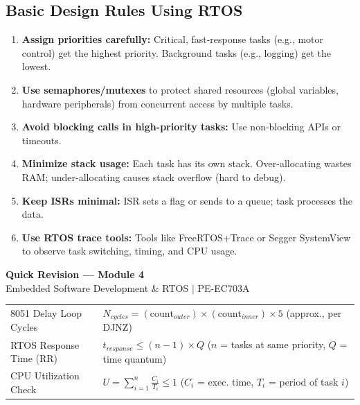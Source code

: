 \documentclass[12pt,a4paper]{article}
\renewcommand{\arraystretch}{1.45}
\begin{document}
\subsection{Basic Design Rules Using RTOS}
\begin{enumerate}[label=\textbf{\arabic*.}, leftmargin=*, itemsep=4pt]
  \item \textbf{Assign priorities carefully:} Critical, fast-response tasks (e.g., motor control) get the highest priority. Background tasks (e.g., logging) get the lowest.
  \item \textbf{Use semaphores/mutexes} to protect shared resources (global variables, hardware peripherals) from concurrent access by multiple tasks.
  \item \textbf{Avoid blocking calls in high-priority tasks:} Use non-blocking APIs or timeouts.
  \item \textbf{Minimize stack usage:} Each task has its own stack. Over-allocating wastes RAM; under-allocating causes stack overflow (hard to debug).
  \item \textbf{Keep ISRs minimal:} ISR sets a flag or sends to a queue; task processes the data.
  \item \textbf{Use RTOS trace tools:} Tools like FreeRTOS+Trace or Segger SystemView to observe task switching, timing, and CPU usage.
\end{enumerate}

\newpage
\begin{center}
  {\large\bfseries\color{myred} Quick Revision --- Module 4}\\[3pt]
  {\small\color{mydark} Embedded Software Development \& RTOS $|$ PE-EC703A}
\end{center}
\noindent{\color{myred}\rule{\linewidth}{1.2pt}}
\vspace{4pt}

\begin{tcolorbox}[formulabox, title={\textbf{Key Formulas at a Glance}}]
\renewcommand{\arraystretch}{1.3}
\begin{tabularx}{\linewidth}{B{4.5cm} X}
8051 Delay Loop Cycles & $N_{cycles} = (\text{count}_{outer}) \times (\text{count}_{inner}) \times 5$ (approx., per DJNZ) \\[4pt]
RTOS Response Time (RR) & $t_{response} \leq (n - 1) \times Q$ \quad ($n$ = tasks at same priority, $Q$ = time quantum) \\[4pt]
CPU Utilization Check & $U = \displaystyle\sum_{i=1}^{n} \frac{C_i}{T_i} \leq 1$ \quad ($C_i$ = exec. time, $T_i$ = period of task $i$)
\end{tabularx}
\end{tcolorbox}
\end{document}
